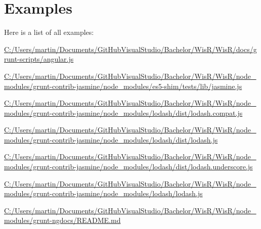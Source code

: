 \section{Examples}
Here is a list of all examples\+:\begin{DoxyCompactItemize}
\item 
\hyperlink{_c_1_2_users_2martin_2_documents_2_git_hub_visual_studio_2_bachelor_2_wis_r_2_wis_r_2docs_2grunt-scripts_2angular_8js-example}{C\+:/\+Users/martin/\+Documents/\+Git\+Hub\+Visual\+Studio/\+Bachelor/\+Wis\+R/\+Wis\+R/docs/grunt-\/scripts/angular.\+js}
\item 
\hyperlink{_c_1_2_users_2martin_2_documents_2_git_hub_visual_studio_2_bachelor_2_wis_r_2_wis_r_2node_moduledf1d3fccefe076e7cba2c20deacf125a}{C\+:/\+Users/martin/\+Documents/\+Git\+Hub\+Visual\+Studio/\+Bachelor/\+Wis\+R/\+Wis\+R/node\+\_\+modules/grunt-\/contrib-\/jasmine/node\+\_\+modules/es5-\/shim/tests/lib/jasmine.\+js}
\item 
\hyperlink{_c_1_2_users_2martin_2_documents_2_git_hub_visual_studio_2_bachelor_2_wis_r_2_wis_r_2node_modulee415aeb2dbdd42fcbde611cc30319a59}{C\+:/\+Users/martin/\+Documents/\+Git\+Hub\+Visual\+Studio/\+Bachelor/\+Wis\+R/\+Wis\+R/node\+\_\+modules/grunt-\/contrib-\/jasmine/node\+\_\+modules/lodash/dist/lodash.\+compat.\+js}
\item 
\hyperlink{_c_1_2_users_2martin_2_documents_2_git_hub_visual_studio_2_bachelor_2_wis_r_2_wis_r_2node_module55788165fa73e07bbb561ea13c73be7a}{C\+:/\+Users/martin/\+Documents/\+Git\+Hub\+Visual\+Studio/\+Bachelor/\+Wis\+R/\+Wis\+R/node\+\_\+modules/grunt-\/contrib-\/jasmine/node\+\_\+modules/lodash/dist/lodash.\+js}
\item 
\hyperlink{_c_1_2_users_2martin_2_documents_2_git_hub_visual_studio_2_bachelor_2_wis_r_2_wis_r_2node_module7177f8a9b7ba50c68ab6568b5f38636b}{C\+:/\+Users/martin/\+Documents/\+Git\+Hub\+Visual\+Studio/\+Bachelor/\+Wis\+R/\+Wis\+R/node\+\_\+modules/grunt-\/contrib-\/jasmine/node\+\_\+modules/lodash/dist/lodash.\+underscore.\+js}
\item 
\hyperlink{_c_1_2_users_2martin_2_documents_2_git_hub_visual_studio_2_bachelor_2_wis_r_2_wis_r_2node_modulec47812ef7ee63cf6c5bd869c7a0b4fdc}{C\+:/\+Users/martin/\+Documents/\+Git\+Hub\+Visual\+Studio/\+Bachelor/\+Wis\+R/\+Wis\+R/node\+\_\+modules/grunt-\/contrib-\/jasmine/node\+\_\+modules/lodash/lodash.\+js}
\item 
\hyperlink{_c_1_2_users_2martin_2_documents_2_git_hub_visual_studio_2_bachelor_2_wis_r_2_wis_r_2node_module442882db47c09482797f86bb499e8b95}{C\+:/\+Users/martin/\+Documents/\+Git\+Hub\+Visual\+Studio/\+Bachelor/\+Wis\+R/\+Wis\+R/node\+\_\+modules/grunt-\/ngdocs/\+R\+E\+A\+D\+M\+E.\+md}

\end{DoxyCompactItemize}
